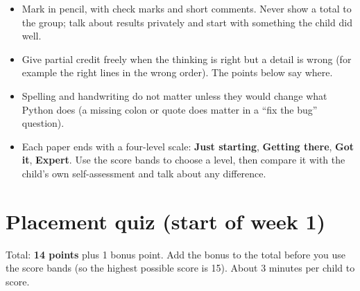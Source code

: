
\begin{teachernote}
\begin{itemize}[itemsep=1pt]
  \item Mark in pencil, with check marks and short comments. Never show a total to the group; talk
        about results privately and start with something the child did well.
  \item Give partial credit freely when the thinking is right but a detail is wrong (for example the
        right lines in the wrong order). The points below say where.
  \item Spelling and handwriting do not matter unless they would change what Python does
        (a missing colon or quote does matter in a \enquote{fix the bug} question).
  \item Each paper ends with a four-level scale: \textbf{Just starting}, \textbf{Getting there},
        \textbf{Got it}, \textbf{Expert}. Use the score bands to choose a level, then compare it
        with the child's own self-assessment and talk about any difference.
\end{itemize}
\end{teachernote}

\section{Placement quiz (start of week 1)}
Total: \textbf{14 points} plus 1 bonus point. Add the bonus to the total before you use the score bands
(so the highest possible score is 15). About 3 minutes per child to score.

